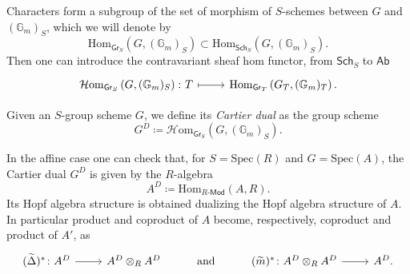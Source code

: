 \documentclass[../Main]{subfiles}
\begin{document}
\begin{rem}[]
	Characters form a subgroup of the set of morphism of $S$-schemes
	between $G$ and $(\mathbb{G}_m)_S$, which we will denote by
	\begin{equation*}
		\mathrm{Hom}_{\mathsf{Gr}_S} \left( G, (\mathbb{G}_m)_S \right)
		\subset
		\mathrm{Hom}_{\mathsf{Sch}_{ S }} \left( G, (\mathbb{G}_m)_S \right)
	.\end{equation*} 
	Then one can introduce the contravariant sheaf hom functor,
	from $\mathsf{Sch}_{ S }$ to $\mathsf{Ab}$
	\begin{equation*}
	\begin{tikzcd}[row sep = 0ex
		,/tikz/column 1/.append style={anchor=base east}
		,/tikz/column 2/.append style={anchor=base west}]
		\mathcal{H}\mathrm{om}_{\mathsf{Gr}_S} \left( G, (\mathbb{G}_m)_S \right)\colon
		T \arrow[r, "", mapsto] & 
		\mathrm{Hom}_{\mathsf{Gr}_T} \left( G_T, (\mathbb{G}_m)_T \right)
	.\end{tikzcd}
	\end{equation*} 
\end{rem}

\begin{defn}
	Given an $S$-group scheme $G$, we define its {\em Cartier dual}
	as the group scheme
	\begin{equation*}
		G^D \coloneqq \mathcal{H}\mathrm{om}_{\mathsf{Gr}_S} \left( G, (\mathbb{G}_m)_S \right)
	.\end{equation*} 
\end{defn}


\begin{rem}
	In the affine case one can check that, for $S = \mathrm{Spec}(R)$
	and $G = \mathrm{Spec}(A)$, the Cartier dual $G^D$ is given by
	the $R$-algebra 
	\begin{equation*}
	A^D \coloneqq \mathrm{Hom}_{R\text{-}\mathsf{Mod}} \left( A, R \right)
	.\end{equation*} 
	Its Hopf algebra structure is obtained dualizing the Hopf algebra
	structure of $A$.
	In particular product and coproduct of $A$ become, respectively,
	coproduct and product of $A'$, as
	\begin{equation*}
	\begin{tikzcd}
		(\widetilde{\Delta})^*\colon
		A^D \arrow[r, "", rightarrow] &
		A^D \otimes_R A^D &
		\text{\text{and}} &
		(\widetilde{m})^*\colon
		A^D \otimes_R A^D \arrow[r, "", rightarrow] &
		A^D 
	.\end{tikzcd}
	\end{equation*}
	
\end{rem}
\end{document}
